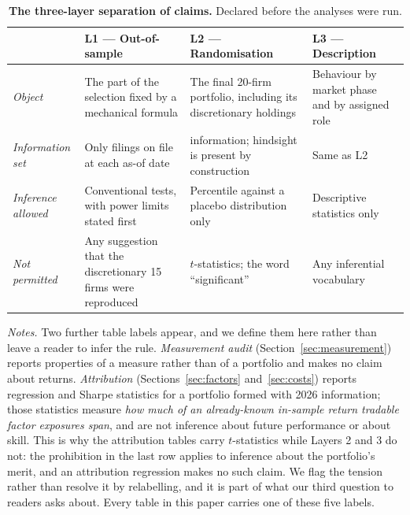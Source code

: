 \documentclass[a4paper,11pt]{article}
\begin{document}
\begin{table}[htbp]
\centering\small
\caption{\textbf{The three-layer separation of claims.} Declared before the analyses were run.}
\label{tab:layers}
\renewcommand{\arraystretch}{1.25}
\begin{tabularx}{\textwidth}{@{}l>{\raggedright\arraybackslash}X>{\raggedright\arraybackslash}X>{\raggedright\arraybackslash}X@{}}
\toprule
& \textbf{L1 --- Out-of-sample} & \textbf{L2 --- Randomisation} & \textbf{L3 --- Description} \\
\midrule
\emph{Object} &
The part of the selection fixed by a mechanical formula &
The final 20-firm portfolio, including its discretionary holdings &
Behaviour by market phase and by assigned role \\
\emph{Information set} &
Only filings on file at each as-of date &
2026 information; hindsight is present by construction &
Same as L2 \\
\emph{Inference allowed} &
Conventional tests, with power limits stated first &
Percentile against a placebo distribution only &
Descriptive statistics only \\
\emph{Not permitted} &
Any suggestion that the discretionary 15 firms were reproduced &
$t$-statistics; the word ``significant'' &
Any inferential vocabulary \\
\bottomrule
\end{tabularx}
\begin{minipage}{\textwidth}\vspace{2pt}\scriptsize
\textit{Notes.} Two further table labels appear, and we define them here rather than leave a reader to
infer the rule. \emph{Measurement audit} (Section~\ref{sec:measurement}) reports properties of a
measure rather than of a portfolio and makes no claim about returns. \emph{Attribution}
(Sections~\ref{sec:factors} and~\ref{sec:costs}) reports regression and Sharpe statistics for a
portfolio formed with 2026 information; those statistics measure \emph{how much of an already-known
in-sample return tradable factor exposures span}, and are not inference about future performance or
about skill. This is why the attribution tables carry $t$-statistics while Layers 2 and 3 do not: the
prohibition in the last row applies to inference about the portfolio's merit, and an attribution
regression makes no such claim. We flag the tension rather than resolve it by relabelling, and it is
part of what our third question to readers asks about. Every table in this paper carries one of these
five labels.
\end{minipage}
\end{table}
\end{document}
